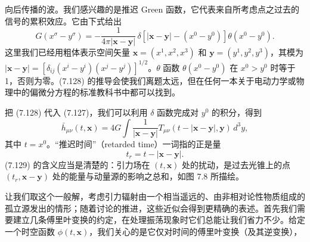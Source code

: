 
向后传播的波。我们感兴趣的是推迟 Green 函数，它代表来自所考虑点之过去的信号的累积效应。它由下式给出
\begin{equation*}
G(x^\sigma - y^\sigma) = -\frac{1}{4\pi|\mathbf{x}-\mathbf{y}|}\,\delta\!\left[|\mathbf{x}-\mathbf{y}| - (x^{0} - y^{0})\right]\theta(x^{0} - y^{0}).
\tag{7.128}
\end{equation*}
这里我们已经用粗体表示空间矢量 $\mathbf{x} = (x^{1}, x^{2}, x^{3})$ 和 $\mathbf{y} = (y^{1}, y^{2}, y^{3})$，其模为 $|\mathbf{x}-\mathbf{y}| = [\delta_{ij}(x^{i}-y^{i})(x^{j}-y^{j})]^{1/2}$。$\theta$ 函数 $\theta(x^{0}-y^{0})$ 在 $x^{0} > y^{0}$ 时等于 1，否则为零。(7.128) 的推导会使我们离题太远，但在任何一本关于电动力学或物理中的偏微分方程的标准教科书中都可以找到。

把 (7.128) 代入 (7.127)，我们可以利用 $\delta$ 函数完成对 $y^{0}$ 的积分，得到
\begin{equation*}
\bar{h}_{\mu\nu}(t, \mathbf{x}) = 4G\int \frac{1}{|\mathbf{x}-\mathbf{y}|}T_{\mu\nu}(t - |\mathbf{x}-\mathbf{y}|, \mathbf{y})\, d^{3}y,
\tag{7.129}
\end{equation*}
其中 $t = x^{0}$。“推迟时间”（retarded time）一词指的正是量
\begin{equation*}
t_r = t - |\mathbf{x}-\mathbf{y}|.
\tag{7.130}
\end{equation*}
(7.129) 的含义应当是清楚的：引力场在 $(t, \mathbf{x})$ 处的扰动，是过去光锥上的点 $(t_r, \mathbf{x}-\mathbf{y})$ 处的能量与动量源的影响之总和，如图 7.8 所描绘。


让我们取这个一般解，考虑引力辐射由一个相当遥远的、由非相对论性物质组成的孤立源发出的情形；随着讨论的推进，这些近似会得到更精确的表述。首先我们需要建立几条傅里叶变换的约定，在处理振荡现象时它们总能让我们省力不少。给定一个时空函数 $\phi(t, \mathbf{x})$，我们关心的是它仅对时间的傅里叶变换（及其逆变换），


